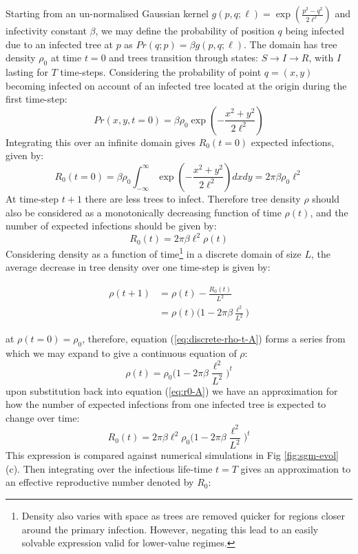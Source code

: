 Starting from an un-normalised Gaussian kernel $g(p, q; \ell) = \exp(\frac{p^2-q^2}{2\ell^2})$ and infectivity constant $\beta$, we may define the probability of position $q$ being infected due to an infected tree at $p$ as $Pr(q; p) = \beta g(p, q; \ell)$. The domain has tree density $\rho_0$ at time $t=0$ and trees transition through states: $S\rightarrow I\rightarrow R$, with $I$ lasting for $T$ time-steps. Considering the probability of point $q = (x, y)$ becoming infected on account of an infected tree located at the origin during the first time-step:
\begin{equation}
    Pr(x, y, t=0) = \beta \rho_0 \exp(-\frac{x^2+y^2}{2\ell^2})
\end{equation}{}
 Integrating this over an infinite domain gives $R_0(t=0)$ expected infections, given by:
\begin{equation}
    R_0(t = 0) = \beta \rho_0 \int^{\infty}_{-\infty} \exp(-\frac{x^2+y^2}{2\ell^2})dx dy= 2\pi\beta\rho_0\ell^2
\end{equation}{}
At time-step $t+1$ there are less trees to infect. Therefore tree density $\rho$ should also be considered as a monotonically decreasing function of time $\rho(t)$, and the number of expected infections should be given by:
\begin{equation}
    R_0(t) = 2\pi\beta\ell^2\rho(t)
    \label{eq:r0-A}
\end{equation}{}
 Considering density as a function of time\footnote{Density also varies with space as trees are removed quicker for regions closer around the primary infection. However, negating this lead to an easily solvable expression valid for lower-value regimes.} in a discrete domain of size $L$, the average decrease in tree density over one time-step is given by:

\begin{equation}
\label{eq:discrete-rho-t-A}
\begin{split}
\rho(t+1) & = \rho(t) - \frac{R_0(t)}{L^2} \\
 & = \rho(t)\Big(1 - 2\pi\beta\frac{\ell^2}{L^2} \Big)
\end{split}
\end{equation}

at $\rho(t=0)=\rho_0$, therefore, equation (\ref{eq:discrete-rho-t-A}) forms a series from which we may expand to give a continuous equation of $\rho$:
\begin{equation}
    \rho(t) = \rho_0 \big(1 - 2\pi\beta\frac{\ell^2}{L^2}\big)^t
\end{equation}{}
upon substitution back into equation (\ref{eq:r0-A}) we have an approximation for how the number of expected infections from one infected tree is expected to change over time:
\begin{equation}
    R_0(t) = 2\pi\beta\ell^2\rho_0 \big(1 - 2\pi\beta\frac{\ell^2}{L^2} \big)^t
    \label{eq:Rt-A}
\end{equation}{}
This expression is compared against numerical simulations in Fig \ref{fig:sgm-evol}(c). Then integrating over the infectious life-time $t=T$ gives an approximation to an effective reproductive number denoted by $R_0$:

